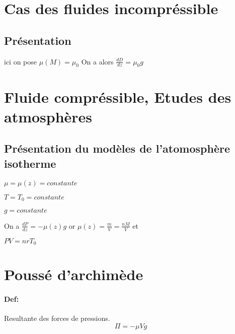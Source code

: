 \documentclass[a4paper,10pt]{report}
\begin{document}
\section{Cas des fluides incompréssible}
\subsection{Présentation}
ici on pose 
\begin{math}
 \mu(M)=\mu_0
\end{math}
On a alors 
\begin{math}
 \frac{d D}{d z} = \mu_0 g
\end{math}
\section{Fluide compréssible, Etudes des atmosphères}
\subsection{Présentation du modèles de l'atomosphère isotherme}


\begin{math}
 \mu = \mu(z) = constante
\end{math}

\begin{math}
 T=T_0=constante
\end{math}

\begin{math}
 g=constante
\end{math}

On a 
\begin{math}
 \frac{d P}{d z}=- \mu (z) g
\end{math}
or 
\begin{math}
 \mu(z) = \frac{m}{V} = \frac{nM}{V}
\end{math}
et 

\begin{math}
 PV= nrT_0 
\end{math}

\section{Poussé d'archimède}
\paragraph{Def:}Resultante des forces de pressions.
\begin{equation}
 \Pi=-\mu Vg
\end{equation}
\end{document}
